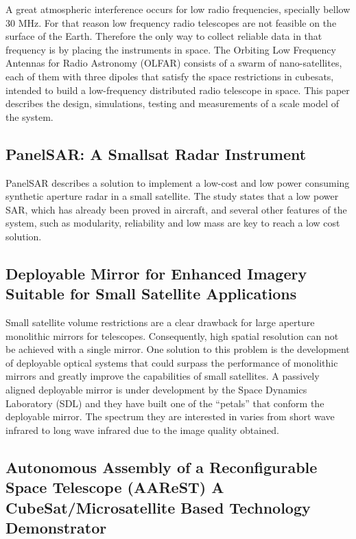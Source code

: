 A great atmospheric interference occurs for low radio frequencies,
specially bellow 30 MHz. For that reason low frequency radio telescopes
are not feasible on the surface of the Earth. Therefore the only way
to collect reliable data in that frequency is by placing the instruments
in space. The Orbiting Low Frequency Antennas for Radio Astronomy
(OLFAR) consists of a swarm of nano-satellites, each of them with
three dipoles that satisfy the space restrictions in cubesats, intended
to build a low-frequency distributed radio telescope in space. This
paper describes the design, simulations, testing and measurements
of a scale model of the system. \cite{Quillen_FF_RadioTelescope}

\subsection{PanelSAR: A Smallsat Radar Instrument}

PanelSAR describes a solution to implement a low-cost and low power consuming synthetic aperture radar in a small satellite. The study states that a low power SAR, which has already been proved in aircraft, and several other features of the system, such as modularity, reliability and low mass are key to reach a low cost solution.\cite{Dujin_Radar}

\subsection{Deployable Mirror for Enhanced Imagery Suitable for Small Satellite Applications}

Small satellite volume restrictions are a clear drawback for large
aperture monolithic mirrors for telescopes. Consequently, high spatial
resolution can not be achieved with a single mirror. One solution
to this problem is the development of deployable optical systems that
could surpass the performance of monolithic mirrors and greatly improve
the capabilities of small satellites. A passively aligned deployable
mirror is under development by the Space Dynamics Laboratory (SDL) and
they have built one of the ``petals'' that conform the deployable
mirror. The spectrum they are interested in varies from short wave
infrared to long wave infrared due to the image quality obtained.\cite{Champagne_deployablemirror}

\subsection{Autonomous Assembly of a Reconfigurable Space Telescope (AAReST) \textendash{} A CubeSat/Microsatellite Based Technology Demonstrator}

